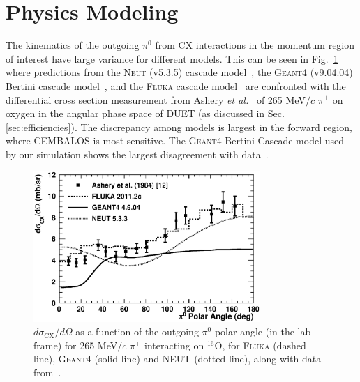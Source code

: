 \section{Physics Modeling}\label{sec:physics}
The kinematics of the outgoing $\pi^0$ from CX interactions in the momentum region of interest have large variance for different models. This can be seen in Fig.~\ref{fig:pi0kinem} where predictions from the \textsc{Neut} (v5.3.5) cascade model~\cite{NEUT}, the \textsc{Geant4} (v9.04.04) Bertini cascade model~\cite{bertini}, and the \textsc{Fluka} cascade model~\cite{fluka1,fluka2} are confronted with the differential cross section measurement from Ashery \textit{et al.}~\cite{Ashery2} of 265 MeV$/c$ $\pi^{+}$ on oxygen in the angular phase space of DUET (as discussed in Sec. \ref{sec:efficiencies}). The discrepancy among models is largest in the forward region, where CEMBALOS is most sensitive. The \textsc{Geant4} Bertini Cascade model used by our simulation shows the largest disagreement with data~\cite{Ashery2}.

\begin{figure}[h]
 \includegraphics[width=86mm]{figures/dsigma_cx_o16_data_and_models_v2.eps}
 \caption{$d\sigma_{\mathrm{CX}}/d\Omega$ as a function of the outgoing $\pi^0$ polar angle (in the lab frame) for 265 MeV$/c$ $\pi^{+}$ interacting on $^{16}$O, for \textsc{Fluka} (dashed line), \textsc{Geant4} (solid line) and \textsc{NEUT} (dotted line), along with data from~\cite{Ashery2}.}
 \label{fig:pi0kinem}
\end{figure}

